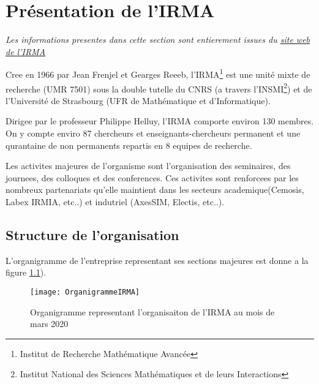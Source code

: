 
\chapter{Présentation de l'IRMA} %

\label{Chapter2} %

\textit{Les informations presentes dans cette section sont entierement issues du \href{http://irma.math.unistra.fr/}{site web de l'IRMA}}

Cree en 1966 par Jean Frenjel et Gearges Reeeb, l'IRMA\footnote{Institut de Recherche Mathématique Avancée} est une  unité mixte de recherche (UMR 7501) sous la double tutelle du CNRS (a travers l'INSMI\footnote{Institut National des Sciences Mathématiques et de leurs Interactions}) et de l’Université de Strasbourg (UFR de Mathématique et d’Informatique).

Dirigee par le professeur Philippe Helluy, l'IRMA comporte environ 130 membres. On y compte enviro 87 chercheurs et enseignants-chercheurs permanent et une qurantaine de non permanents repartis en 8 equipes de recherche.

Les activites majeures de l'organisme sont l'organisation des seminaires, des journees, des colloques et des conferences. Ces activites sont renforcees par les nombreux partenariats qu'elle maintient dans les secteurs academique(Cemosis, Labex IRMIA, etc..) et indutriel (AxesSIM, Electis, etc..).


\section{Structure de l'organisation}
L'organigramme de l'entreprise representant ses sections majeures est donne a la figure \ref{fig:OrganigrammeIRMA}).

\begin{figure}[!h]
\centering
\texttt{[image: OrganigrammeIRMA]} 
\decoRule
\caption[Organigramme de l'IRMA]{Organigramme representant l'organisaiton de l'IRMA au mois de mars 2020 \parencite{Reference7}}
\label{fig:OrganigrammeIRMA}
\end{figure}


